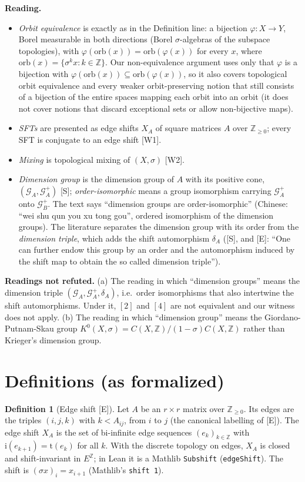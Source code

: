 \documentclass[11pt]{article}
\theoremstyle{definition}
\newtheorem{definition}[theorem]{Definition}
\theoremstyle{remark}
\newcommand{\Z}{\mathbb{Z}}
\begin{document}
\textbf{Reading.}
\begin{itemize}
\item \emph{Orbit equivalence} is exactly as in the Definition line: a bijection
$\varphi:X\to Y$, Borel measurable in both directions (Borel $\sigma$-algebras of the subspace
topologies), with $\varphi(\mathrm{orb}(x))=\mathrm{orb}(\varphi(x))$ for every $x$, where
$\mathrm{orb}(x)=\{\sigma^k x: k\in\Z\}$. Our non-equivalence argument uses only that $\varphi$ is a
bijection with $\varphi(\mathrm{orb}(x))\subseteq\mathrm{orb}(\varphi(x))$, so it also covers
topological orbit equivalence and every weaker orbit-preserving notion that still consists of a
bijection of the entire spaces mapping each orbit into an orbit (it does not cover notions that
discard exceptional sets or allow non-bijective maps).
\item \emph{SFTs} are presented as edge shifts $X_A$ of square matrices $A$ over $\Z_{\ge 0}$; every
SFT is conjugate to an edge shift [W1].
\item \emph{Mixing} is topological mixing of $(X,\sigma)$ [W2].
\item \emph{Dimension group} is the dimension group of $A$ with its positive cone,
$(\mathcal G_A,\mathcal G_A^+)$ [S]; \emph{order-isomorphic} means a group isomorphism carrying
$\mathcal G_A^+$ onto $\mathcal G_B^+$. The text says ``dimension groups are order-isomorphic''
(Chinese: ``wei shu qun you xu tong gou'', ordered isomorphism of the dimension groups). The
literature separates the dimension group with its order from the \emph{dimension triple}, which adds
the shift automorphism $\delta_A$ ([S], and [E]: ``One can further endow this group by an order and
the automorphism induced by the shift map to obtain the so called dimension triple'').
\end{itemize}
\textbf{Readings not refuted.} (a) The reading in which ``dimension groups'' means the dimension
triple $(\mathcal G_A,\mathcal G_A^+,\delta_A)$, i.e.\ order isomorphisms that also intertwine the
shift automorphisms. Under it, $[2]$ and $[4]$ are not equivalent and our witness does not apply.
(b) The reading in which ``dimension group'' means the Giordano-Putnam-Skau group
$K^0(X,\sigma)=C(X,\Z)/(1-\sigma)C(X,\Z)$ rather than Krieger's dimension group.

\section{Definitions (as formalized)}

\begin{definition}[Edge shift {[E]}]
Let $A$ be an $r\times r$ matrix over $\Z_{\ge0}$. Its edges are the triples $(i,j,k)$ with
$k<A_{ij}$, from $i$ to $j$ (the canonical labelling of [E]). The edge shift $X_A$ is the set of
bi-infinite edge sequences $(e_k)_{k\in\Z}$ with $\mathrm{i}(e_{k+1})=\mathrm{t}(e_k)$ for all
$k$. With the discrete topology on edges, $X_A$ is closed and shift-invariant in $E^{\Z}$; in Lean it
is a Mathlib \texttt{Subshift} (\texttt{edgeShift}). The shift is $(\sigma x)_i=x_{i+1}$ (Mathlib's
\texttt{shift 1}).
\end{definition}
\end{document}
